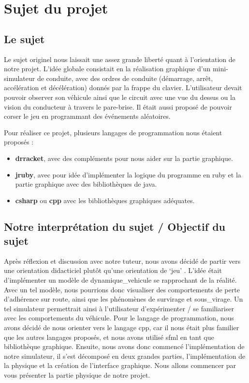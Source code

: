 \usepackage{glossaries}\section{Sujet du projet}\label{sec:sujet-du-projet}
\subsection{Le sujet}\label{subsec:le-sujet}
Le sujet originel nous laissait une assez grande liberté quant à l'orientation de notre projet.
L'idée globale consistait en la réalisation graphique d'un mini-simulateur de conduite, avec des ordres de conduite (démarrage, arrêt, accélération et décélération) donnés par la frappe du clavier.
L'utilisateur devait pouvoir observer son véhicule ainsi que le circuit avec une vue du dessus ou la vision du conducteur à travers le pare-brise.
Il était aussi proposé de pouvoir \og corser\fg{} le jeu en programmant des événements aléatoires.

Pour réaliser ce projet, plusieurs langages de programmation nous étaient proposés :
\begin{itemize}
    \item \textbf{\gls{drracket}}, avec des compléments pour nous aider sur la partie graphique.
    \item \textbf{\gls{jruby}}, avec pour idée d'implémenter la logique du programme en \gls{ruby} et la partie graphique avec des bibliothèques de \gls{java}.
    \item \textbf{\gls{csharp}} ou \textbf{\gls{cpp}} avec les bibliothèques graphiques adéquates.
\end{itemize}


\subsection{Notre interprétation du sujet / Objectif du sujet}\label{subsec:notre-interpretation-du-sujet-/-objectif-du-sujet}
Après réflexion et discussion avec notre tuteur, nous avons décidé de partir vers une orientation didacticiel plutôt qu'une \og orientation de `jeu' \fg{}.
L'idée était d'implémenter un modèle de \gls{dynamique_vehicule} se rapprochant de la réalité.
Avec un tel modèle, nous pourrions donc visualiser des comportements de perte d'adhérence sur route, ainsi que les phénomènes de \gls{survirage} et \gls{sous_virage}.
Un tel simulateur permettrait ainsi à l'utilisateur d'expérimenter / se familiariser avec les comportements du véhicule.
Pour le langage de programmation, nous avons décidé de nous orienter vers le langage \gls{cpp}, car il nous était plus familier que les autres langages proposés, et nous avons utilisé \gls{sfml} en tant que bibliothèque graphique.
Ensuite, nous avons donc commencé l'implémentation de notre simulateur, il s'est décomposé en deux grandes parties, l'implémentation de la physique et la création de l'interface graphique.
Nous allons commencer par vous présenter la partie physique de notre projet.

\newpage